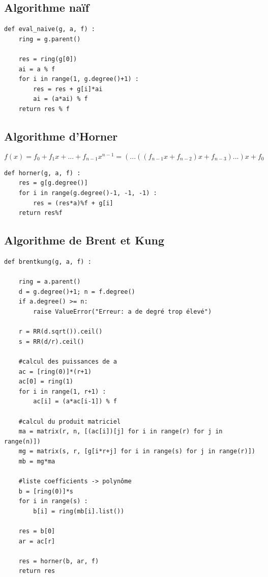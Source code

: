 \documentclass[a4paper]{article}
\begin{document}
\subsection{Algorithme naïf}

\begin{lstlisting}[title={naive}]
def eval_naive(g, a, f) :
	ring = g.parent()

	res = ring(g[0])
	ai = a % f
	for i in range(1, g.degree()+1) :
		res = res + g[i]*ai
		ai = (a*ai) % f
	return res % f
\end{lstlisting}

\subsection{Algorithme d'Horner}

\[
f(x)=f_0+f_1x+...+f_{n-1}x^{n-1}= (...((f_{n-1}x+f_{n-2})x+f_{n-3})...)x+f_0    
\]

\begin{lstlisting}[title={Horner}]
def horner(g, a, f) :
    res = g[g.degree()]
    for i in range(g.degree()-1, -1, -1) :
        res = (res*a)%f + g[i]
    return res%f
\end{lstlisting}

\subsection{Algorithme de Brent et Kung}

\begin{lstlisting}[title={brent and kung}]
def brentkung(g, a, f) :

	ring = a.parent()
	d = g.degree()+1; n = f.degree()
	if a.degree() >= n:
		raise ValueError("Erreur: a de degré trop élevé")

	r = RR(d.sqrt()).ceil()
	s = RR(d/r).ceil()

    #calcul des puissances de a
	ac = [ring(0)]*(r+1)
	ac[0] = ring(1)
	for i in range(1, r+1) :
		ac[i] = (a*ac[i-1]) % f

    #calcul du produit matriciel
	ma = matrix(r, n, [(ac[i])[j] for i in range(r) for j in range(n)])
	mg = matrix(s, r, [g[i*r+j] for i in range(s) for j in range(r)])
	mb = mg*ma

    #liste coefficients -> polynôme
	b = [ring(0)]*s
	for i in range(s) :
		b[i] = ring(mb[i].list())

	res = b[0]
	ar = ac[r]

	res = horner(b, ar, f)
	return res
\end{lstlisting}
\end{document}
